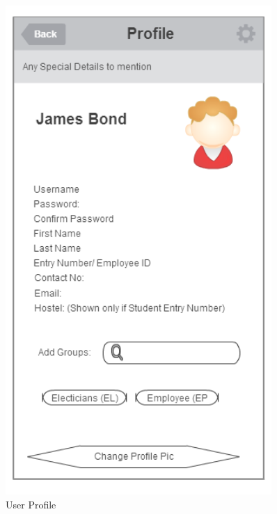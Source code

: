 \documentclass[12pt]{article}
\begin{document}
     \begin{figure}[!ht]
      \begin{minipage}{.32\textwidth}
        \centering
        \includegraphics[width=0.9\textwidth]{./appMockUp/profileScreen}
        \caption{User Profile}
        \label{fig:profileScreen}
      \end{minipage}
      \begin{minipage}{.32\textwidth}
        \centering

\end{minipage}
\end{figure}
\end{document}
